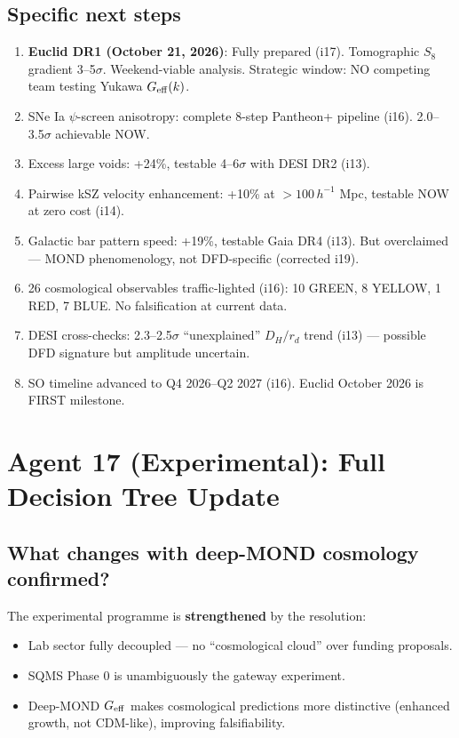 \documentclass[11pt]{article}
\begin{document}
\subsection{Specific next steps}
\begin{enumerate}
\item \textbf{Euclid DR1 (October 21, 2026)}: Fully prepared (i17). Tomographic $S_8$
gradient 3--5$\sigma$. Weekend-viable analysis. Strategic window: NO competing team
testing Yukawa $G_{\rm eff}(k)$.
\item SNe Ia $\psi$-screen anisotropy: complete 8-step Pantheon+ pipeline (i16).
2.0--3.5$\sigma$ achievable NOW.
\item Excess large voids: +24\%, testable 4--6$\sigma$ with DESI DR2 (i13).
\item Pairwise kSZ velocity enhancement: +10\% at $>100\,h^{-1}$ Mpc, testable NOW
at zero cost (i14).
\item Galactic bar pattern speed: +19\%, testable Gaia DR4 (i13). But overclaimed ---
MOND phenomenology, not DFD-specific (corrected i19).
\item 26 cosmological observables traffic-lighted (i16): 10 GREEN, 8 YELLOW, 1 RED,
7 BLUE. No falsification at current data.
\item DESI cross-checks: 2.3--2.5$\sigma$ ``unexplained'' $D_H/r_d$ trend (i13) ---
possible DFD signature but amplitude uncertain.
\item SO timeline advanced to Q4 2026--Q2 2027 (i16). Euclid October 2026 is FIRST milestone.
\end{enumerate}

\newpage
\section{Agent 17 (Experimental): Full Decision Tree Update}
\label{sec:agent17}

\subsection{What changes with deep-MOND cosmology confirmed?}

The experimental programme is \textbf{strengthened} by the resolution:
\begin{itemize}
\item Lab sector fully decoupled --- no ``cosmological cloud'' over funding proposals.
\item SQMS Phase 0 is unambiguously the gateway experiment.
\item Deep-MOND $G_{\rm eff}$ makes cosmological predictions more distinctive (enhanced
growth, not CDM-like), improving falsifiability.
\end{itemize}
\end{document}
